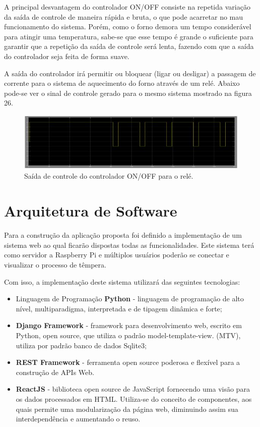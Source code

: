 A principal desvantagem do controlador ON/OFF consiste na repetida variação da saída de controle de maneira rápida e bruta, o que pode acarretar no mau funcionamento do sistema. Porém, como o forno demora um tempo considerável para atingir uma temperatura, sabe-se que esse tempo é grande o suficiente para garantir que a repetição da saída de controle será lenta, fazendo com que a saída do controlador seja feita de forma suave.

A saída do controlador irá permitir ou bloquear (ligar ou desligar) a passagem de corrente para o sistema de aquecimento do forno através de um relé. Abaixo pode-se ver o sinal de controle gerado para o mesmo sistema mostrado na figura 26.

\begin{figure}[h]
	\centering
	\label{saida_controle}
	\includegraphics[keepaspectratio=true,scale=0.8]{figuras/saida_controle.JPG}
	\caption{Saída de controle do controlador ON/OFF para o relé.}
\end{figure}

\section{Arquitetura de Software}

Para a construção da aplicação proposta foi definido a implementação de um sistema web ao qual ficarão dispostas todas as funcionalidades. Este sistema terá como servidor a Raspberry Pi e múltiplos usuários poderão se conectar e visualizar o processo de têmpera.

Com isso, a implementação deste sistema utilizará das seguintes tecnologias:
\begin{itemize}
	\item Linguagem de Programação \textbf{Python} - linguagem de programação de alto nível, multiparadigma, interpretada e de tipagem dinâmica e forte;
	\item \textbf{Django Framework} - framework para desenvolvimento web, escrito em Python, open source, que utiliza o padrão model-template-view. (MTV), utiliza por padrão banco de dados Sqlite3;
	\item \textbf{REST Framework} -  ferramenta open source poderosa e flexível para a construção de APIs Web.
	\item \textbf{ReactJS} - biblioteca open source de JavaScript fornecendo uma visão para os dados processados em HTML. Utiliza-se do conceito de componentes, aos quais permite uma modularização da página web, diminuindo assim sua interdependência e aumentando o reuso.
	
\end{itemize}

